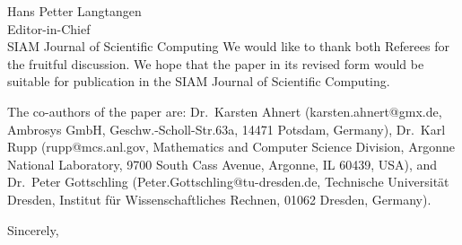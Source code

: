 \documentclass[a4paper,11pt]{letter}
\begin{document}
\begin{letter}{
    Hans Petter Langtangen\\
    Editor-in-Chief\\
    SIAM Journal of Scientific Computing
    }
We would like to thank both Referees for the fruitful discussion. We hope that
the paper in its revised form would be suitable for publication in the SIAM
Journal of Scientific Computing.


The co-authors of the paper are: Dr.~Karsten Ahnert (karsten.ahnert@gmx.de,
Ambrosys GmbH, Geschw.-Scholl-Str.63a, 14471 Potsdam, Germany), Dr.~Karl Rupp
(rupp@mcs.anl.gov, Mathematics and Computer Science Division, Argonne National
Laboratory, 9700 South Cass Avenue, Argonne, IL 60439, USA), and Dr.~Peter
Gottschling (Peter.Gottschling@tu-dresden.de, Technische Universit\"at Dresden,
Institut f\"ur Wissenschaftliches Rechnen, 01062 Dresden, Germany).

\closing{Sincerely,}

\end{letter}
\end{document}
